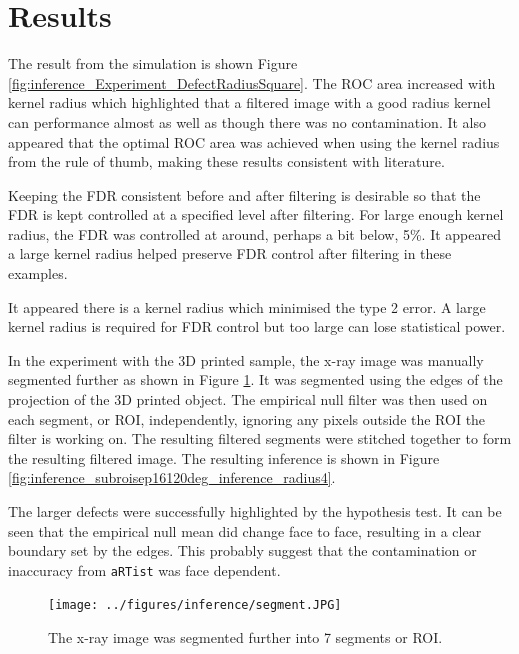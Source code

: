 \documentclass{proc}
\begin{document}
\section{Results}

The result from the simulation is shown Figure \ref{fig:inference_Experiment_DefectRadiusSquare}. The ROC area increased with kernel radius which highlighted that a filtered image with a good radius kernel can performance almost as well as though there was no contamination. It also appeared that the optimal ROC area was achieved when using the kernel radius from the rule of thumb, making these results consistent with literature.

Keeping the FDR consistent before and after filtering is desirable so that the FDR is kept controlled at a specified level after filtering. For large enough kernel radius, the FDR was controlled at around, perhaps a bit below, 5\%. It appeared a large kernel radius helped preserve FDR control after filtering in these examples. 

It appeared there is a kernel radius which minimised the type 2 error. A large kernel radius is required for FDR control but too large can lose statistical power.

In the experiment with the 3D printed sample, the x-ray image was manually segmented further as shown in Figure \ref{fig:inference_segmentFurther}. It was segmented using the edges of the projection of the 3D printed object. The empirical null filter was then used on each segment, or ROI, independently, ignoring any pixels outside the ROI the filter is working on. The resulting filtered segments were stitched together to form the resulting filtered image. The resulting inference is shown in Figure \ref{fig:inference_subroisep16120deg_inference_radius4}.

The larger defects were successfully highlighted by the hypothesis test. It can be seen that the empirical null mean did change face to face, resulting in a clear boundary set by the edges. This probably suggest that the contamination or inaccuracy from \texttt{aRTist} was face dependent.

\begin{figure}
  \centering
  \texttt{[image: ../figures/inference/segment.JPG]}
  \caption{The x-ray image was segmented further into 7 segments or ROI.}
  \label{fig:inference_segmentFurther}
\end{figure}
\end{document}
